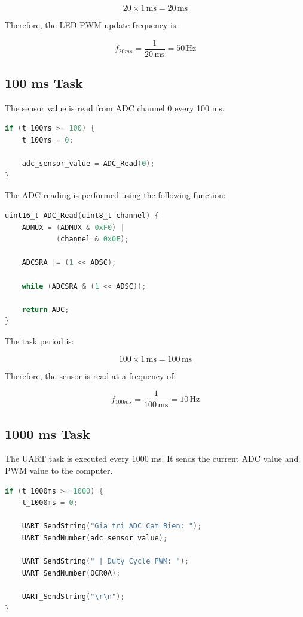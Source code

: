 \documentclass[12pt,a4paper]{article}
\begin{document}
\[
20\times1\,\mathrm{ms}
=
20\,\mathrm{ms}
\]

Therefore, the LED PWM update frequency is:

\[
f_{20ms}
=
\frac{1}{20\,\mathrm{ms}}
=
50\,\mathrm{Hz}
\]

\subsection{100 ms Task}

The sensor value is read from ADC channel 0 every 100 ms.

\begin{lstlisting}[language=C]
if (t_100ms >= 100) {
    t_100ms = 0;

    adc_sensor_value = ADC_Read(0);
}
\end{lstlisting}

The ADC reading is performed using the following function:

\begin{lstlisting}[language=C]
uint16_t ADC_Read(uint8_t channel) {
    ADMUX = (ADMUX & 0xF0) |
            (channel & 0x0F);

    ADCSRA |= (1 << ADSC);

    while (ADCSRA & (1 << ADSC));

    return ADC;
}
\end{lstlisting}

The task period is:

\[
100\times1\,\mathrm{ms}
=
100\,\mathrm{ms}
\]

Therefore, the sensor is read at a frequency of:

\[
f_{100ms}
=
\frac{1}{100\,\mathrm{ms}}
=
10\,\mathrm{Hz}
\]

\subsection{1000 ms Task}

The UART task is executed every 1000 ms. It sends the current ADC
value and PWM value to the computer.

\begin{lstlisting}[language=C]
if (t_1000ms >= 1000) {
    t_1000ms = 0;

    UART_SendString("Gia tri ADC Cam Bien: ");
    UART_SendNumber(adc_sensor_value);

    UART_SendString(" | Duty Cycle PWM: ");
    UART_SendNumber(OCR0A);

    UART_SendString("\r\n");
}
\end{lstlisting}
\end{document}

